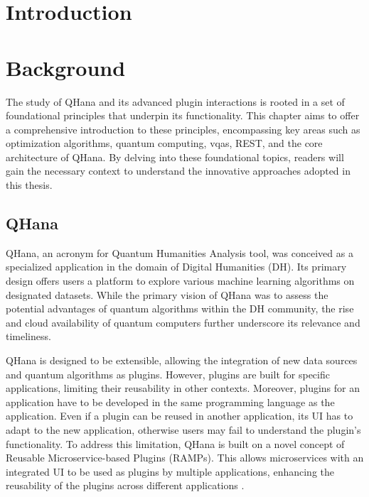 \documentclass[
  a4paper,  %
  twoside,  %
  bibliography=totoc,
  headsepline,
  cleardoublepage=empty,
  parskip=half,
  draft=false
]{scrbook}
\begin{document}
\chapter{Introduction}
\label{chap:introduction}

\chapter{Background}
\label{chap:background}

The study of QHana and its advanced plugin interactions is rooted in a set of foundational principles that underpin its functionality.
This chapter aims to offer a comprehensive introduction to these principles, encompassing key areas such as optimization algorithms, quantum computing, \glspl{vqa}, REST, and the core architecture of QHana.
By delving into these foundational topics, readers will gain the necessary context to understand the innovative approaches adopted in this thesis.

\section{QHana}
\label{sec:qhana}

QHana, an acronym for Quantum Humanities Analysis tool, was conceived as a specialized application in the domain of Digital Humanities (DH).
Its primary design offers users a platform to explore various machine learning algorithms on designated datasets.
While the primary vision of QHana was to assess the potential advantages of quantum algorithms within the DH community, the rise and cloud availability of quantum computers further underscore its relevance and timeliness.

QHana is designed to be extensible, allowing the integration of new data sources and quantum algorithms as plugins.
However, plugins are built for specific applications, limiting their reusability in other contexts.
Moreover, plugins for an application have to be developed in the same programming language as the application.
Even if a plugin can be reused in another application, its UI has to adapt to the new application, otherwise users may fail to understand the plugin's functionality.
To address this limitation, QHana is built on a novel concept of Reusable Microservice-based Plugins (RAMPs).
This allows microservices with an integrated UI to be used as plugins by multiple applications, enhancing the reusability of the plugins across different applications \cite{Buehler2022}.
\end{document}
